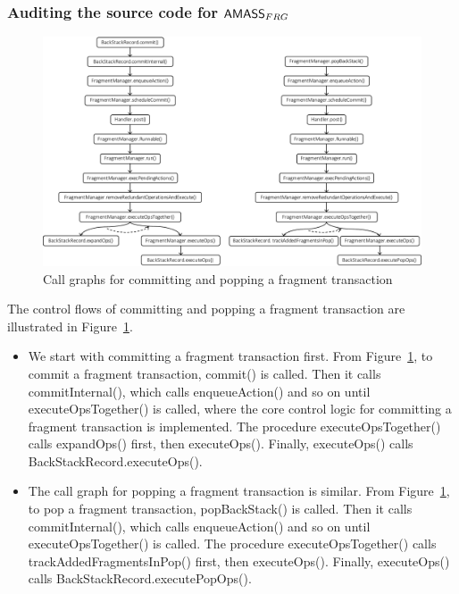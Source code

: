 \subsubsection{Auditing the source code for $\textsf{AMASS}_{FRG}$}
\begin{figure}
        \centering
        \includegraphics[scale = 0.55]{commit.pdf}
        \caption{Call graphs for committing and popping a fragment transaction}
    \label{fig:commit}
\end{figure}

The control flows of committing and popping a fragment transaction are illustrated in Figure~\ref{fig:commit}. 
\begin{itemize}
\item We start with committing a fragment transaction first. From Figure~\ref{fig:commit}, to commit a fragment transaction, commit() is called. Then it calls commitInternal(), which calls enqueueAction() and so on  until executeOpsTogether() is called, where the core control logic for committing a fragment transaction is implemented. The procedure executeOpsTogether() calls expandOps() first, then executeOps(). Finally, executeOps() calls BackStackRecord.executeOps(). 
%
\item The call graph for popping a fragment transaction is similar. From Figure~\ref{fig:commit}, to pop a fragment transaction, popBackStack() is called. Then it calls commitInternal(), which calls enqueueAction() and so on  until executeOpsTogether() is called. The procedure executeOpsTogether() calls trackAddedFragmentsInPop() first, then executeOps(). Finally, executeOps() calls BackStackRecord.executePopOps(). 
\end{itemize}

